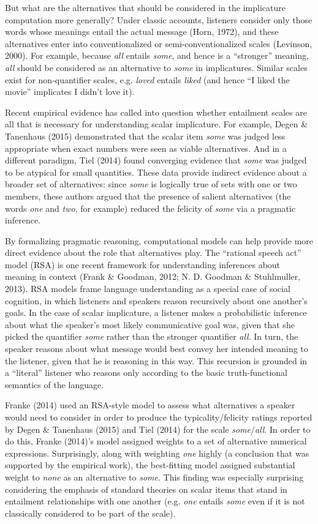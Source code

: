\documentclass[10pt, letterpaper]{article}
\begin{document}
But what are the alternatives that should be considered in the
implicature computation more generally? Under classic accounts,
listeners consider only those words whose meanings entail the actual
message (Horn, 1972), and these alternatives enter into conventionalized
or semi-conventionalized scales (Levinson, 2000). For example, because
\emph{all} entails \emph{some}, and hence is a ``stronger'' meaning,
\emph{all} should be considered as an alternative to \emph{some} in
implicatures. Similar scales exist for non-quantifier scales, e.g.
\emph{loved} entails \emph{liked} (and hence ``I liked the movie''
implicates I didn't love it).

Recent empirical evidence has called into question whether entailment
scales are all that is necessary for understanding scalar implicature.
For example, Degen \& Tanenhaus (2015) demonstrated that the scalar item
\emph{some} was judged less appropriate when exact numbers were seen as
viable alternatives. And in a different paradigm, Tiel (2014) found
converging evidence that \emph{some} was judged to be atypical for small
quantities. These data provide indirect evidence about a broader set of
alternatives: since \emph{some} is logically true of sets with one or
two members, these authors argued that the presence of salient
alternatives (the words \emph{one} and \emph{two}, for example) reduced
the felicity of \emph{some} via a pragmatic inference.

By formalizing pragmatic reasoning, computational models can help
provide more direct evidence about the role that alternatives play. The
``rational speech act'' model (RSA) is one recent framework for
understanding inferences about meaning in context (Frank \& Goodman,
2012; N. D. Goodman \& Stuhlmuller, 2013). RSA models frame language
understanding as a special case of social cognition, in which listeners
and speakers reason recursively about one another's goals. In the case
of scalar implicature, a listener makes a probabilistic inference about
what the speaker's most likely communicative goal was, given that she
picked the quantifier \emph{some} rather than the stronger quantifier
\emph{all}. In turn, the speaker reasons about what message would best
convey her intended meaning to the listener, given that he is reasoning
in this way. This recursion is grounded in a ``literal'' listener who
reasons only according to the basic truth-functional semantics of the
language.

Franke (2014) used an RSA-style model to assess what alternatives a
speaker would need to consider in order to produce the
typicality/felicity ratings reported by Degen \& Tanenhaus (2015) and
Tiel (2014) for the scale \emph{some}/\emph{all}. In order to do this,
Franke (2014)'s model assigned weights to a set of alternative numerical
expressions. Surprisingly, along with weighting \emph{one} highly (a
conclusion that was supported by the empirical work), the best-fitting
model assigned substantial weight to \emph{none} as an alternative to
\emph{some}. This finding was especially surprising considering the
emphasis of standard theories on scalar items that stand in entailment
relationships with one another (e.g. \emph{one} entails \emph{some} even
if it is not classically considered to be part of the scale).
\end{document}
